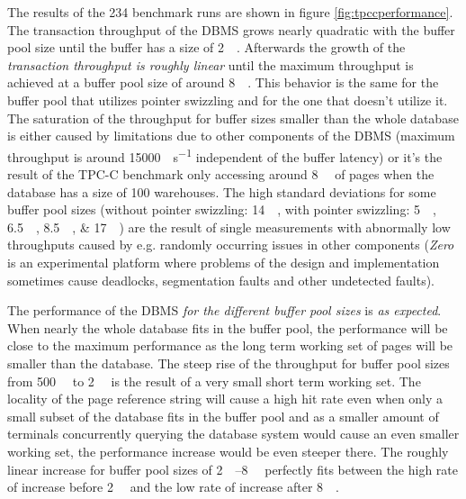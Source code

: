 	The results of the \num{234} benchmark runs are shown in figure \ref{fig:tpccperformance}. The transaction throughput of the DBMS grows nearly quadratic with the buffer pool size until the buffer has a size of \SI{2}{\gibi\byte}. Afterwards the growth of the \emph{transaction throughput is roughly linear} until the maximum throughput is achieved at a buffer pool size of around \SI{8}{\gibi\byte}. This behavior is the same for the buffer pool that utilizes pointer swizzling and for the one that doesn't utilize it. The saturation of the throughput for buffer sizes smaller than the whole database is either caused by limitations due to other components of the DBMS (maximum throughput is around \SI{15000}{\transactions\per\second} independent of the buffer latency) or it's the result of the TPC-C benchmark only accessing around \SI{8}{\gibi\byte} of pages when the database has a size of 100 warehouses. The high standard deviations for some buffer pool sizes (without pointer swizzling: \SI{14}{\gibi\byte}, with pointer swizzling: \SIlist{5; 6.5; 8.5; 17}{\gibi\byte}) are the result of single measurements with abnormally low throughputs caused by e.g. randomly occurring issues in other components (\emph{Zero} is an experimental platform where problems of the design and implementation sometimes cause deadlocks, segmentation faults and other undetected faults).

	The performance of the DBMS \emph{for the different buffer pool sizes} is \emph{as expected}. When nearly the whole database fits in the buffer pool, the performance will be close to the maximum performance as the long term working set of pages will be smaller than the database. The steep rise of the throughput for buffer pool sizes from \SI{500}{\mebi\byte} to \SI{2}{\gibi\byte} is the result of a very small short term working set. The locality of the page reference string will cause a high hit rate even when only a small subset of the database fits in the buffer pool and as a smaller amount of terminals concurrently querying the database system would cause an even smaller working set, the performance increase would be even steeper there. The roughly linear increase for buffer pool sizes of \SIrange{2}{8}{\gibi\byte} perfectly fits between the high rate of increase before \SI{2}{\gibi\byte} and the low rate of increase after \SI{8}{\gibi\byte}.

